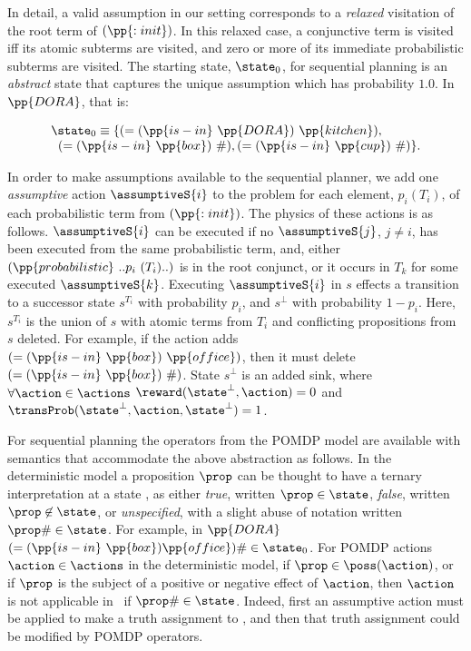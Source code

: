 \noindent In detail, a valid assumption in our setting corresponds to a {\em
relaxed} visitation of the root term of $(\pp{:init})$. In this
relaxed case, a conjunctive term is visited iff its atomic subterms
are visited, and zero or more of its immediate probabilistic subterms
are visited. The starting state, $\state_0$, for sequential planning
is an {\em abstract} state that captures the unique assumption which
has probability $1.0$. In $\pp{DORA}$, that is:

\[
\begin{array}{l}
\state_0 \equiv \{(=(\pp{is-in}~\pp{DORA})~\pp{kitchen}),\\
\;\;(=(\pp{is-in}~\pp{box})~\#), (=(\pp{is-in}~\pp{cup})~\#)\}.
\end{array}
\]

In order to make assumptions available to the sequential planner, we
add one {\em assumptive} action $\assumptiveS{i}$ to the problem for
each element, $p_i (T_i)$, of each probabilistic term from
$(\pp{:init})$. The physics of these actions is as
follows. $\assumptiveS{i}$ can be executed if no $\assumptiveS{j}$,
$j \neq i$, has been executed from the same probabilistic term, and,
either $(\pp{probabilistic}~..p_i~(T_i)..)$ is in the root conjunct,
or it occurs in $T_k$ for some executed $\assumptiveS{k}$.
Executing $\assumptiveS{i}$ in $s$ effects a transition to a successor
state $s^{T_i}$ with probability $p_i$, and $s^\bot$ with probability
$1 - p_i$. Here, $s^{T_i}$ is the union of $s$ with atomic terms from
$T_i$ and conflicting propositions from $s$ deleted. For example, if
the action adds $(=(\pp{is-in}~\pp{box})~\pp{office})$, then it must
delete $(=(\pp{is-in}~\pp{box})~\#)$. State $s^\bot$ is an added sink,
where $\forall\action\in\actions$ $\reward(\state^\bot, \action) = 0$
and $\transProb(\state^\bot, \action, \state^\bot) = 1$.

For sequential planning the operators from the POMDP model are
available with semantics that accommodate the above abstraction as
follows. In the deterministic model a proposition $\prop$ can be
thought to have a ternary interpretation at a state \state, as either
{\em true}, written $\prop\in\state$, {\em false}, written
$\prop\not\in\state$, or {\em unspecified}, with a slight abuse of
notation written $\prop\#\in\state$. For example, in $\pp{DORA}$
$(=(\pp{is-in}~\pp{box})\pp{office})\#\in\state_0$. For POMDP actions
$\action\in\actions$ in the deterministic model, if
$\prop \in \poss(\action)$, or if $\prop$ is the subject of a positive
or negative effect of $\action$, then $\action$ is not applicable
in \state\ if $\prop\#\in\state$. Indeed, first an assumptive action
must be applied to make a truth assignment to \prop, and then that
truth assignment could be modified by POMDP operators. 


